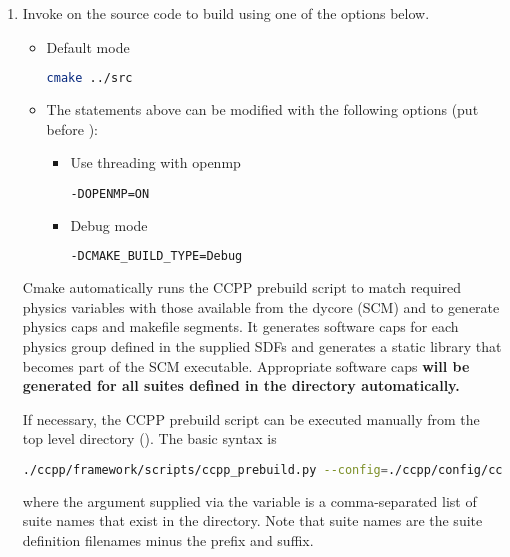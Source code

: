 \begin{enumerate}
 \item Invoke  on the source code to build using one of the options below.
\begin{itemize}
\item Default mode
\begin{lstlisting}[language=bash]
cmake ../src
\end{lstlisting}
\item The statements above can be modified with the following options (put before ):
\begin{itemize}
\item Use threading with openmp
\begin{lstlisting}[language=bash]
-DOPENMP=ON
\end{lstlisting}
\item Debug mode
\begin{lstlisting}[language=bash]
-DCMAKE_BUILD_TYPE=Debug
\end{lstlisting}
\end{itemize}
\end{itemize}

Cmake automatically runs the CCPP prebuild script to match required physics variables with those available from the dycore (SCM) and to generate physics caps and makefile segments. It generates software caps for each physics group defined in the supplied SDFs and generates a static library that becomes part of the SCM executable. Appropriate software caps \textbf{will be generated for all suites defined in the  directory automatically.}

If necessary, the CCPP prebuild script can be executed manually from the top level directory (). The basic syntax is
\begin{lstlisting}[language=bash]
./ccpp/framework/scripts/ccpp_prebuild.py --config=./ccpp/config/ccpp_prebuild_config.py --static --suites=SCM_GFS_v15p2,SCM_GFS_v16beta,SCM_GSD_v1[...] --builddir=./scm/bin [--debug]
\end{lstlisting}
where the argument supplied via the  variable is a comma-separated list of suite names that exist in the  directory. Note that suite names are the suite definition filenames minus the  prefix and  suffix.
   

\end{enumerate}
